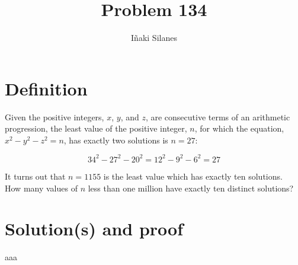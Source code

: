 \documentclass[english]{article}
\begin{document}
\newcommand{\mc}{\multicolumn}
\newcommand{\mr}{\multirow}
\newcommand{\cw}{\columnwidth}
\newcommand{\ig}[2]{\texttt{[image: \#2]}}

\title{Problem 134}
\author{I\~naki Silanes}
\maketitle

\section{Definition}

Given the positive integers, $x$, $y$, and $z$, are consecutive terms of an arithmetic progression, the least value of the positive integer, $n$, for which the equation, $x^2 - y^2 - z^2 = n$, has exactly two solutions is $n = 27$:

\begin{equation}
34^2 - 27^2 - 20^2 = 12^2 - 9^2 - 6^2 = 27
\end{equation}

It turns out that $n = 1155$ is the least value which has exactly ten solutions.\\

How many values of $n$ less than one million have exactly ten distinct solutions?

\section{Solution(s) and proof}

aaa
\end{document}
